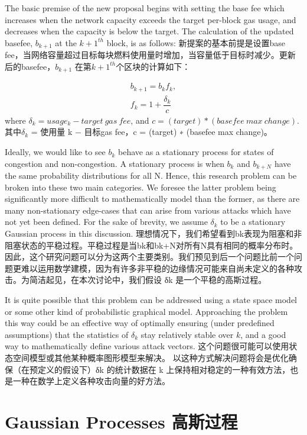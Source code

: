 \documentclass{ctexart}
\begin{document}
The basic premise of the new proposal begins with setting the base fee which increases when the network capacity exceeds the target per-block gas usage, and decreases when the capacity is below the target. The calculation of the updated basefee, $b_{k+1}$ at the $k+1^{th}$ block,  is as follows:
新提案的基本前提是设置base fee，当网络容量超过目标每块燃料使用量时增加，当容量低于目标时减少。更新后的basefee，$b_{k+1}$ 在第$k+1^{th}$个区块的计算如下：

\begin{eqnarray} \label{eq:eip1559}
b_{k+1} = b_{k} f_{k}, \\
f_{k} = 1 + \dfrac{\delta_{k}}{c}
\end{eqnarray}
where $\delta_{k} = usage_{k} - target~gas~fee$, and $c = (target)*(basefee~max~change)$. 其中$\delta_{k}$ = 使用量 k − 目标gas fee，c = (target) ∗ (basefee max change)。

Ideally, we would like to see $b_{k}$ behave as a stationary process for states of congestion and non-congestion. A stationary process is when $b_{k}$ and $b_{k+N}$ have the same probability distributions for all N. Hence, this research problem can be broken into these two main categories. We foresee the latter problem being significantly more difficult to mathematically model than the former, as there are many non-stationary edge-cases that can arise from various attacks which have not yet been defined. For the sake of brevity, we assume $\delta_{k}$ to be a stationary Gaussian process in this discussion. 理想情况下，我们希望看到bk表现为阻塞和非阻塞状态的平稳过程。平稳过程是当bk和bk+N对所有N具有相同的概率分布时。因此，这个研究问题可以分为这两个主要类别。我们预见到后一个问题比前一个问题更难以运用数学建模，因为有许多非平稳的边缘情况可能来自尚未定义的各种攻击。为简洁起见，在本次讨论中，我们假设 δk 是一个平稳的高斯过程。

It is quite possible that this problem can be addressed using a state space model or some other kind of probabilistic graphical model. Approaching the problem this way could be an effective way of optimally ensuring (under predefined assumptions) that the statistics of $\delta_{k}$ stay relatively stable over $k$, and a good way to mathematically define various attack vectors. 这个问题很可能可以使用状态空间模型或其他某种概率图形模型来解决。 以这种方式解决问题将会是优化确保（在预定义的假设下）δk 的统计数据在 k 上保持相对稳定的一种有效方法，也是一种在数学上定义各种攻击向量的好方法。

\section{Gaussian Processes 高斯过程}
\label{appendix:marginal}
\end{document}
